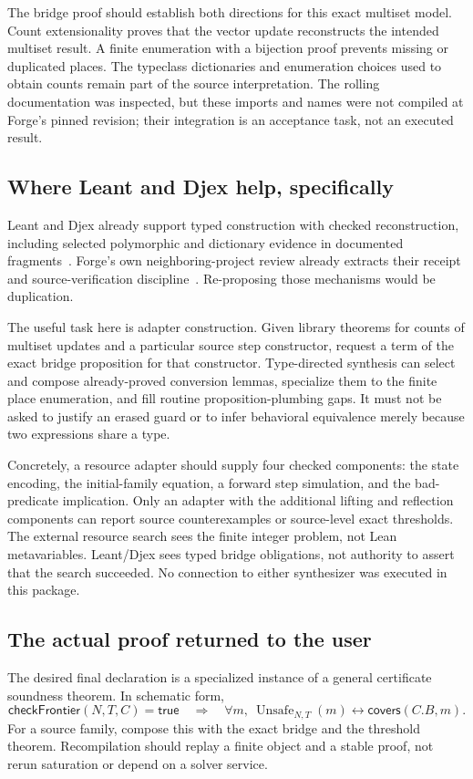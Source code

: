 \documentclass[11pt,a4paper]{article}
\newcommand{\Unsafe}{\operatorname{Unsafe}}
\theoremstyle{definition}
\theoremstyle{remark}
\begin{document}
The bridge proof should establish both directions for this exact multiset model. Count extensionality proves that the vector update reconstructs the intended multiset result. A finite enumeration with a bijection proof prevents missing or duplicated places. The typeclass dictionaries and enumeration choices used to obtain counts remain part of the source interpretation. The rolling documentation was inspected, but these imports and names were not compiled at Forge's pinned revision; their integration is an acceptance task, not an executed result.

\subsection{Where Leant and Djex help, specifically}
Leant and Djex already support typed construction with checked reconstruction, including selected polymorphic and dictionary evidence in documented fragments~\cite{leant,djex}. Forge's own neighboring-project review already extracts their receipt and source-verification discipline~\cite{forge-neighbors}. Re-proposing those mechanisms would be duplication.

The useful task here is adapter construction. Given library theorems for counts of multiset updates and a particular source step constructor, request a term of the exact bridge proposition for that constructor. Type-directed synthesis can select and compose already-proved conversion lemmas, specialize them to the finite place enumeration, and fill routine proposition-plumbing gaps. It must not be asked to justify an erased guard or to infer behavioral equivalence merely because two expressions share a type.

Concretely, a resource adapter should supply four checked components: the state encoding, the initial-family equation, a forward step simulation, and the bad-predicate implication. Only an adapter with the additional lifting and reflection components can report source counterexamples or source-level exact thresholds. The external resource search sees the finite integer problem, not Lean metavariables. Leant/Djex sees typed bridge obligations, not authority to assert that the search succeeded. No connection to either synthesizer was executed in this package.

\subsection{The actual proof returned to the user}
The desired final declaration is a specialized instance of a general certificate soundness theorem. In schematic form,
\[
 \mathsf{checkFrontier}(N,T,C)=\mathsf{true}
 \quad\Longrightarrow\quad
 \forall m,\ \Unsafe_{N,T}(m)\leftrightarrow\mathsf{covers}(C.B,m).
\]
For a source family, compose this with the exact bridge and the threshold theorem. Recompilation should replay a finite object and a stable proof, not rerun saturation or depend on a solver service.
\end{document}
